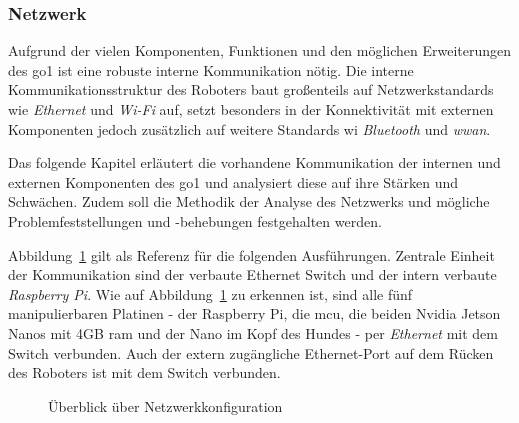 \subsubsection{Netzwerk}
\label{subsubsec:netzwerk}

Aufgrund der vielen Komponenten, Funktionen und den möglichen Erweiterungen des \gls{go1} ist eine robuste interne Kommunikation nötig.
Die interne Kommunikationsstruktur des Roboters baut großenteils auf Netzwerkstandards wie \emph{Ethernet} und \emph{Wi-Fi} auf,
setzt besonders in der Konnektivität mit externen Komponenten jedoch zusätzlich auf weitere Standards wi \emph{Bluetooth} und \emph{\gls{wwan}}.

Das folgende Kapitel erläutert die vorhandene Kommunikation der internen und externen Komponenten des \gls{go1} und analysiert diese
auf ihre Stärken und Schwächen.
Zudem soll die Methodik der Analyse des Netzwerks und mögliche Problemfeststellungen und -behebungen festgehalten werden.

\label{par:netzwerk_ueberblick}

Abbildung~\ref{fig:netzwerk_ueberblick} gilt als Referenz für die folgenden Ausführungen.
Zentrale Einheit der Kommunikation sind der verbaute Ethernet Switch  und
der intern verbaute \emph{Raspberry Pi}.
Wie auf Abbildung~\ref{fig:netzwerk_ueberblick} zu erkennen ist, sind alle fünf manipulierbaren Platinen -
der Raspberry Pi, die \gls{mcu}, die beiden Nvidia Jetson Nanos mit \num{4}GB \gls{ram} und der Nano im Kopf des Hundes -
per \emph{Ethernet} mit dem Switch verbunden.
Auch der extern zugängliche Ethernet-Port auf dem Rücken des Roboters ist mit dem Switch verbunden.

\begin{figure}[h]
    \caption{Überblick über Netzwerkkonfiguration}\label{fig:netzwerk_ueberblick}
\end{figure}

